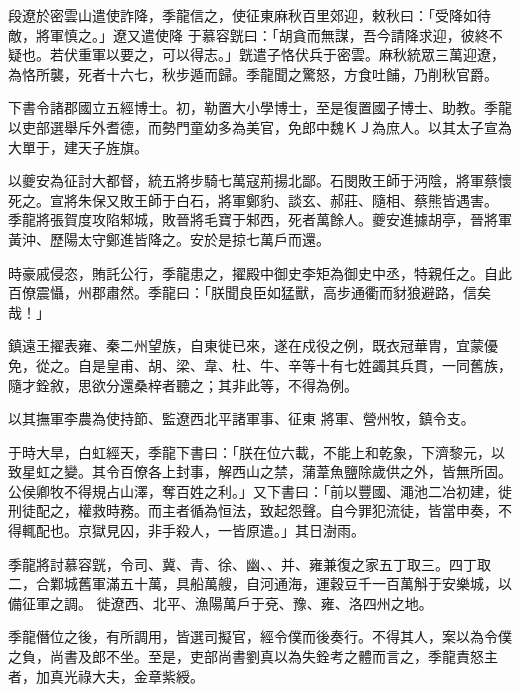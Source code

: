 \begin{pinyinscope}
 段遼於密雲山遣使詐降，季龍信之，使征東麻秋百里郊迎，敕秋曰：「受降如待敵，將軍慎之。」遼又遣使降
 于慕容皝曰：「胡貪而無謀，吾今請降求迎，彼終不疑也。若伏重軍以要之，可以得志。」皝遣子恪伏兵于密雲。麻秋統眾三萬迎遼，為恪所襲，死者十六七，秋步遁而歸。季龍聞之驚怒，方食吐餔，乃削秋官爵。



 下書令諸郡國立五經博士。初，勒置大小學博士，至是復置國子博士、助教。季龍以吏部選舉斥外耆德，而勢門童幼多為美官，免郎中魏ＫＪ為庶人。以其太子宣為大單于，建天子旌旗。



 以夔安為征討大都督，統五將步騎七萬寇荊揚北鄙。石閔敗王師于沔陰，將軍蔡懷死之。宣將朱保又敗王師于白石，將軍鄭豹、談玄、郝莊、隨相、蔡熊皆遇害。
 季龍將張賀度攻陷邾城，敗晉將毛寶于邾西，死者萬餘人。夔安進據胡亭，晉將軍黃沖、歷陽太守鄭進皆降之。安於是掠七萬戶而還。



 時豪戚侵恣，賄託公行，季龍患之，擢殿中御史李矩為御史中丞，特親任之。自此百僚震懾，州郡肅然。季龍曰：「朕聞良臣如猛獸，高步通衢而豺狼避路，信矣哉！」



 鎮遠王擢表雍、秦二州望族，自東徙已來，遂在戍役之例，既衣冠華胄，宜蒙優免，從之。自是皇甫、胡、梁、韋、杜、牛、辛等十有七姓蠲其兵貫，一同舊族，隨才銓敘，思欲分還桑梓者聽之；其非此等，不得為例。



 以其撫軍李農為使持節、監遼西北平諸軍事、征東
 將軍、營州牧，鎮令支。



 于時大旱，白虹經天，季龍下書曰：「朕在位六載，不能上和乾象，下濟黎元，以致星虹之變。其令百僚各上封事，解西山之禁，蒲葦魚鹽除歲供之外，皆無所固。公侯卿牧不得規占山澤，奪百姓之利。」又下書曰：「前以豐國、澠池二冶初建，徙刑徒配之，權救時務。而主者循為恒法，致起怨聲。自今罪犯流徒，皆當申奏，不得輒配也。京獄見囚，非手殺人，一皆原遣。」其日澍雨。



 季龍將討慕容皝，令司、冀、青、徐、幽、、并、雍兼復之家五丁取三。四丁取二，合鄴城舊軍滿五十萬，具船萬艘，自河通海，運穀豆千一百萬斛于安樂城，以備征軍之調。
 徙遼西、北平、漁陽萬戶于兗、豫、雍、洛四州之地。



 季龍僭位之後，有所調用，皆選司擬官，經令僕而後奏行。不得其人，案以為令僕之負，尚書及郎不坐。至是，吏部尚書劉真以為失銓考之體而言之，季龍責怒主者，加真光祿大夫，金章紫綬。




\end{pinyinscope}
